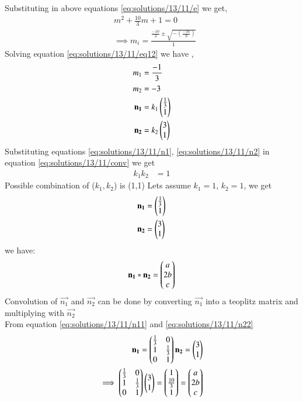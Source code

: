 Substituting  in above equations \eqref{eq:solutions/13/11/e} we get,
\begin{align}
    &m^2+\frac{10}{3}m+1=0\\
    &\implies m_i=\frac{\frac{-10}{3}\pm{\sqrt{-(\frac{-16}{9})}}}{1}\label{eq:solutions/13/11/eq12}
\end{align}
Solving equation \eqref{eq:solutions/13/11/eq12} we have ,
\begin{align}
    m_1&=\frac{-1}{3}\\
    m_2&=-3\\
    \mathbf{n_1}&=k_1\begin{pmatrix}\frac{1}{3}\\1\end{pmatrix}\label{eq:solutions/13/11/n1}\\
    \mathbf{n_2}&=k_2\begin{pmatrix}{3}\\1\end{pmatrix}\label{eq:solutions/13/11/n2}
\end{align}
Substituting equations \eqref{eq:solutions/13/11/n1}, \eqref{eq:solutions/13/11/n2} in equation \eqref{eq:solutions/13/11/conv} we get 
\begin{align}
    k_1k_2&=1
\end{align}
Possible combination of ($k_1,k_2$) is (1,1)
Lets assume $k_1=1$, $k_2=1$, we get 
\begin{align}
    \mathbf{n_1}&=\begin{pmatrix}\frac{1}{3} \\1\end{pmatrix}\label{eq:solutions/13/11/n11}\\
    \mathbf{n_2}&=\begin{pmatrix}3\\1\end{pmatrix}\label{eq:solutions/13/11/n22}
\end{align}
we have:
\begin{align}
\mathbf{n_1}\ast \mathbf{n_2} = \begin{pmatrix}a\\2b\\c\end{pmatrix} \label{eq:solutions/13/11conv1}
\end{align}
Convolution of $\vec{n_1}$ and $\vec{n_2}$ can be done by converting  $\vec{n_1}$ into a teoplitz matrix and multiplying with $\vec{n_2}$\\
From equation \eqref{eq:solutions/13/11/n11} and \eqref{eq:solutions/13/11/n22}
\begin{align}
    \mathbf{n_1}=\begin{pmatrix}\frac{1}{3}&0\\1&\frac{1}{3}\\0&1\end{pmatrix}
    \mathbf{n_2}=\begin{pmatrix}3\\ 1\end{pmatrix}\label{eq:solutions/13/11conv2}\\
\implies \begin{pmatrix}\frac{1}{3}&0\\1&\frac{1}{3}\\0&1\end{pmatrix}\begin{pmatrix}3\\ 1\end{pmatrix} = \begin{pmatrix}1\\\frac{10}{3}\\1\end{pmatrix} = \begin{pmatrix}a\\2b\\c\end{pmatrix}\label{eq:solutions/13/11conv3}
\end{align}
